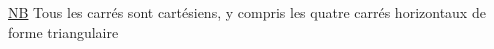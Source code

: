 \uline{NB} Tous les carrés sont cartésiens, y compris les quatre carrés horizontaux de forme triangulaire

\diagram{\begin{tikzcd}[ampersand replacement=\&,row sep=small,column sep=small]
{}\&\&{}\arrow[ll]\\
\&{}\arrow[ul]\&\\
\&\&{}\arrow[ul]\arrow[uu]
\end{tikzcd}}

